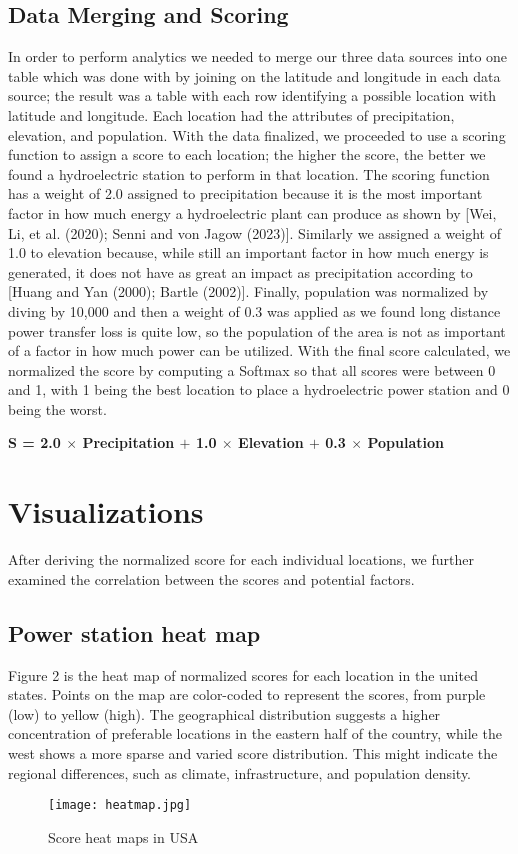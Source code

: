 \documentclass[11pt]{article}
\begin{document}
\subsection{Data Merging and Scoring}
In order to perform analytics we needed to merge our three data sources into one table which was done with by joining on the latitude and longitude in each data source; the result was a table with each row identifying a possible location with latitude and longitude. Each location had the attributes of precipitation, elevation, and population. With the data finalized, we proceeded to use a scoring function to assign a score to each location; the higher the score, the better we found a hydroelectric station to perform in that location. The scoring function has a weight of 2.0 assigned to precipitation because it is the most important factor in how much energy a hydroelectric plant can produce as shown by [Wei, Li, et al. (2020); Senni and von Jagow (2023)]. Similarly we assigned a weight of 1.0 to elevation because, while still an important factor in how much energy is generated, it does not have as great an impact as precipitation according to [Huang and Yan (2000); Bartle (2002)]. Finally, population was normalized by diving by 10,000 and then a weight of 0.3 was applied as we found long distance power transfer loss is quite low, so the population of the area is not as important of a factor in how much power can be utilized. With the final score calculated, we normalized the score by computing a Softmax so that all scores were between 0 and 1, with 1 being the best location to place a hydroelectric power station and 0 being the worst.
\newline
\begin{center}
\large\bfseries
S = 2.0 $\times$ Precipitation $+$ 1.0 $\times$ Elevation $+$ 0.3 $\times$ Population
\end{center}
\section{Visualizations}
After deriving the normalized score for each individual locations, we further examined the correlation between the scores and potential factors.
\subsection{Power station heat map}
Figure 2 is the heat map of normalized scores for each location in the united states. Points on the map are color-coded to represent the scores, from purple (low) to yellow (high). The geographical distribution suggests a higher concentration of preferable locations in the eastern half of the country, while the west shows a more sparse and varied score distribution. This might indicate the regional differences, such as climate, infrastructure, and population density.
\begin{figure}[!h]
\texttt{[image: heatmap.jpg]}
\caption{Score heat maps in USA}
\label{fig:Fig2}
\end{figure}
\end{document}
